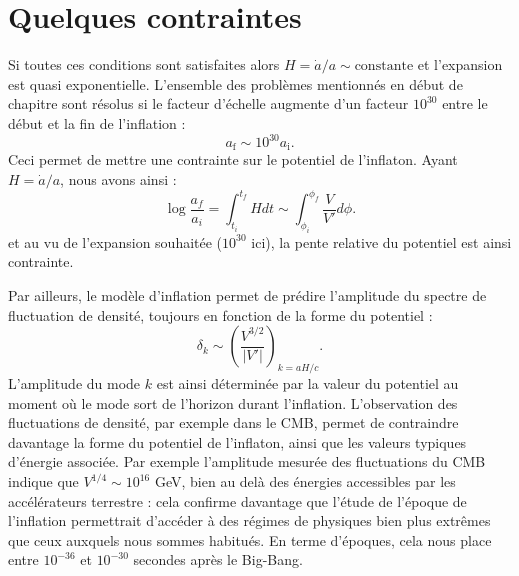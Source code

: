 \section{Quelques contraintes}
Si toutes ces conditions sont satisfaites alors $H=\dot a /a \sim \mathrm{constante}$ et l'expansion est quasi exponentielle. L'ensemble des problèmes mentionnés en début de chapitre sont résolus si le facteur d'échelle augmente d'un facteur $10^{30}$ entre le début et la fin de l'inflation :
\begin{equation}
a_\mathrm{f}\sim 10^{30} a_\mathrm{i}.
\end{equation}
Ceci permet de mettre une contrainte sur le potentiel de l'inflaton. Ayant $H=\dot a/a$, nous avons ainsi :
\begin{equation}
\log \frac{a_f}{a_i}=\int_{t_i}^{t_f} H dt \sim \int_{\phi_i}^{\phi_f}\frac{V}{V'}d \phi.
\end{equation}
et au vu de l'expansion souhaitée ($10^{30}$ ici), la pente relative du potentiel est ainsi contrainte.

Par ailleurs, le modèle d'inflation permet de prédire l'amplitude du spectre de fluctuation de densité, toujours en fonction de la forme du potentiel :
\begin{equation}
\delta_k\sim \left(\frac{V^{3/2}}{|V'|}\right)_{k=aH/c}.
\end{equation}
L'amplitude du mode $k$ est ainsi déterminée par la valeur du potentiel au moment où le mode sort de l'horizon durant l'inflation. L'observation des fluctuations de densité, par exemple dans le CMB, permet de contraindre davantage la forme du potentiel de l'inflaton, ainsi que les valeurs typiques d'énergie associée. Par exemple l'amplitude mesurée des fluctuations du CMB indique que $V^{1/4}\sim 10^{16}$ GeV, bien au delà des énergies accessibles par les accélérateurs terrestre : cela confirme davantage que l'étude de l'époque de l'inflation permettrait d'accéder à des régimes de physiques bien plus extrêmes que ceux auxquels nous sommes habitués.  En terme d'époques, cela nous place entre $10^{-36}$ et $10^{-30}$ secondes après le Big-Bang. 

